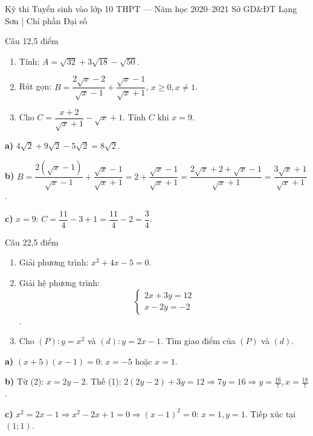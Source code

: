 ﻿%
%
  {Kỳ thi Tuyển sinh vào lớp 10 THPT — Năm học 2020--2021}%
  {Sở GD\&ĐT Lạng Sơn | Chỉ phần Đại số}

\begin{de_cau}{Câu 1}{2,5 điểm}
\begin{enumerate}[label=\alph*)]
\item Tính: $A = \sqrt{32}+3\sqrt{18}-\sqrt{50}$.
\item Rút gọn: $B=\dfrac{2\sqrt{x}-2}{\sqrt{x}-1}+\dfrac{\sqrt{x}-1}{\sqrt{x}+1}$, $x\geq 0, x\neq 1$.
\item Cho $C=\dfrac{x+2}{\sqrt{x}+1}-\sqrt{x}+1$. Tính $C$ khi $x=9$.
\end{enumerate}
\end{de_cau}

\begin{loi_giai_cau}
\textbf{a)} $4\sqrt{2}+9\sqrt{2}-5\sqrt{2}=8\sqrt{2}$.

\textbf{b)} $B=\dfrac{2(\sqrt{x}-1)}{\sqrt{x}-1}+\dfrac{\sqrt{x}-1}{\sqrt{x}+1}=2+\dfrac{\sqrt{x}-1}{\sqrt{x}+1}=\dfrac{2\sqrt{x}+2+\sqrt{x}-1}{\sqrt{x}+1}=\dfrac{3\sqrt{x}+1}{\sqrt{x}+1}$.

\textbf{c)} $x=9$: $C=\dfrac{11}{4}-3+1=\dfrac{11}{4}-2=\dfrac{3}{4}$.
\end{loi_giai_cau}

\begin{de_cau}{Câu 2}{2,5 điểm}
\begin{enumerate}[label=\alph*)]
\item Giải phương trình: $x^2+4x-5=0$.
\item Giải hệ phương trình: 
\[ \begin{cases}2x+3y=12\\x-2y=-2\end{cases} \].
\item Cho $(P)\colon y=x^2$ và $(d)\colon y=2x-1$. Tìm giao điểm của $(P)$ và $(d)$.
\end{enumerate}
\end{de_cau}

\begin{loi_giai_cau}
\textbf{a)} $(x+5)(x-1)=0$: $x=-5$ hoặc $x=1$.

\textbf{b)} Từ (2): $x=2y-2$. Thế (1): $2(2y-2)+3y=12\Rightarrow 7y=16\Rightarrow y=\frac{16}{7}, x=\frac{18}{7}$.

\textbf{c)} $x^2=2x-1\Rightarrow x^2-2x+1=0\Rightarrow(x-1)^2=0$: $x=1, y=1$. Tiếp xúc tại $(1;1)$.
\end{loi_giai_cau}


